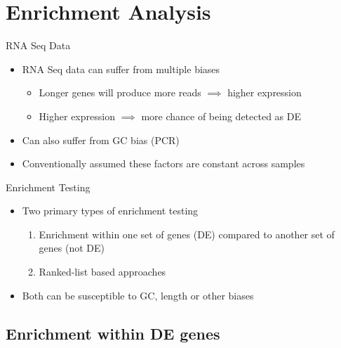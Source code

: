 \documentclass[11pt]{beamer}
\begin{document}
\section{Enrichment Analysis}

\begin{frame}{RNA Seq Data}

	\begin{itemize}
		\item RNA Seq data can suffer from multiple biases
		\begin{itemize}
			\item Longer genes will produce more reads $\implies$ higher expression
			\item Higher expression $\implies$ more chance of being detected as DE
		\end{itemize}
		\item Can also suffer from GC bias (PCR)
		\item Conventionally assumed these factors are constant across samples
	\end{itemize}

\end{frame}

\begin{frame}{Enrichment Testing}
	\begin{itemize}
		\item Two primary types of enrichment testing
		\begin{enumerate}
			\item Enrichment within one set of genes (DE) compared to another set of genes (not DE)
			\item Ranked-list based approaches
		\end{enumerate}
		\item Both can be susceptible to GC, length or other biases
	\end{itemize}
\end{frame}

\subsection{Enrichment within DE genes}
\end{document}
